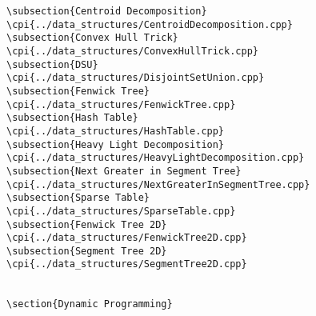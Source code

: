 {\begin{verbatim}
\subsection{Centroid Decomposition}
\cpi{../data_structures/CentroidDecomposition.cpp}
\subsection{Convex Hull Trick}
\cpi{../data_structures/ConvexHullTrick.cpp}
\subsection{DSU}
\cpi{../data_structures/DisjointSetUnion.cpp}
\subsection{Fenwick Tree}
\cpi{../data_structures/FenwickTree.cpp}
\subsection{Hash Table}
\cpi{../data_structures/HashTable.cpp}
\subsection{Heavy Light Decomposition}
\cpi{../data_structures/HeavyLightDecomposition.cpp}
\subsection{Next Greater in Segment Tree}
\cpi{../data_structures/NextGreaterInSegmentTree.cpp}
\subsection{Sparse Table}
\cpi{../data_structures/SparseTable.cpp}
\subsection{Fenwick Tree 2D}
\cpi{../data_structures/FenwickTree2D.cpp}
\subsection{Segment Tree 2D}
\cpi{../data_structures/SegmentTree2D.cpp}


\section{Dynamic Programming}


\end{verbatim}}
